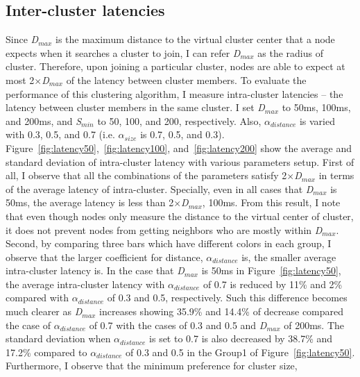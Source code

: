 \subsection{Inter-cluster latencies}
\label{solare:interlatency}
Since \textit{D$_{max}$} is the maximum distance to the virtual cluster
center that a node expects when it searches a cluster to join, I can
refer \textit{D$_{max}$} as the radius of cluster.
%
Therefore, upon joining a particular cluster, nodes are able to expect
at most 2$\times$\textit{D$_{max}$} of the latency between cluster
members.
%
To evaluate the performance of this clustering algorithm, I measure
intra-cluster latencies -- the latency between cluster members in the
same cluster.
%
I set \textit{D$_{max}$} to 50ms, 100ms, and 200ms, and
\textit{S$_{min}$} to 50, 100, and 200, respectively.
%
Also, \textit{$\alpha$$_{distance}$} is varied with 0.3, 0.5, and 0.7 (i.e.
\textit{$\alpha$$_{size}$} is 0.7, 0.5, and 0.3).
%
Figure~\ref{fig:latency50},~\ref{fig:latency100},
and~\ref{fig:latency200} show the average and standard deviation of
intra-cluster latency with various parameters setup.
%
First of all, I observe that all the combinations of the parameters
satisfy 2$\times$\textit{D$_{max}$} in terms of the average latency of
intra-cluster.
%
Specially, even in all cases that \textit{D$_{max}$} is 50ms, the
average latency is less than 2$\times$\textit{D$_{max}$}, 100ms.
%
From this result, I note that even though nodes only measure the
distance to the virtual center of cluster, it does not prevent nodes
from getting neighbors who are mostly within \textit{D$_{max}$}.\\
%
Second, by comparing three bars which have different colors in each
group, I observe that the larger coefficient for distance,
$\alpha$$_{distance}$ is, the smaller average intra-cluster latency is.
%
In the case that \textit{D$_{max}$} is 50ms in
Figure~\ref{fig:latency50}, the average
intra-cluster latency with $\alpha$$_{distance}$ of 0.7 is reduced by
11\% and 2\% compared with $\alpha$$_{distance}$ of 0.3 and 0.5,
respectively.
%
Such this difference becomes much clearer as \textit{D$_{max}$}
increases showing 35.9\% and 14.4\% of decrease compared the case of
$\alpha$$_{distance}$ of 0.7 with the cases of 0.3 and 0.5 and
\textit{D$_{max}$} of 200ms.
%
The standard deviation when $\alpha$$_{distance}$ is set to 0.7 is also
decreased by 38.7\% and 17.2\% compared to $\alpha$$_{distance}$ of 0.3
and 0.5 in the Group1 of Figure~\ref{fig:latency50}.
%
Furthermore, I observe that the minimum preference for cluster size,
